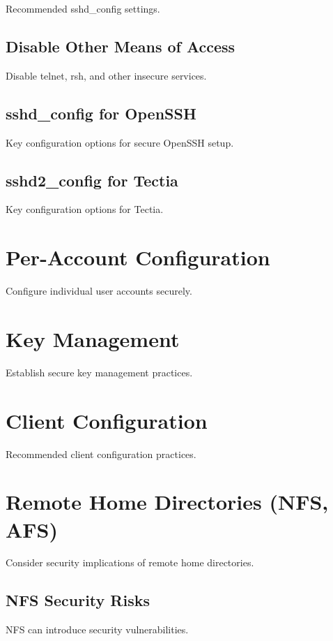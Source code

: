 \documentclass[12pt]{book}
\begin{document}
Recommended sshd_config settings.

\subsection{Disable Other Means of Access}

Disable telnet, rsh, and other insecure services.

\subsection{sshd_config for OpenSSH}

Key configuration options for secure OpenSSH setup.

\subsection{sshd2_config for Tectia}

Key configuration options for Tectia.

\section{Per-Account Configuration}

Configure individual user accounts securely.

\section{Key Management}

Establish secure key management practices.

\section{Client Configuration}

Recommended client configuration practices.

\section{Remote Home Directories (NFS, AFS)}

Consider security implications of remote home directories.

\subsection{NFS Security Risks}

NFS can introduce security vulnerabilities.
\end{document}
